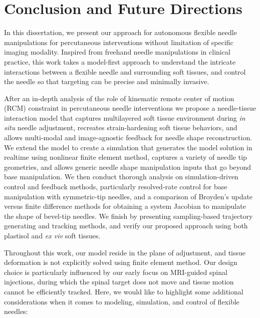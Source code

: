 \chapter{Conclusion and Future Directions}
\label{chap:chap-6}

In this dissertation, we present our approach for autonomous flexible needle manipulations for percutaneous interventions without limitation of specific imaging modality. Inspired from freehand needle manipulations in clinical practice, this work takes a model-first approach to understand the intricate interactions between a flexible needle and surrounding soft tissues, and control the needle so that targeting can be precise and minimally invasive.

After an in-depth analysis of the role of kinematic remote center of motion (RCM) constraint in percutaneous needle interventions  we propose  a needle-tissue interaction model that captures multilayered soft tissue environment during \textit{in situ} needle adjustment, recreates strain-hardening soft tissue behaviors, and allows multi-modal and image-agnostic feedback for needle shape reconstruction. We extend the model  to create a simulation that generates the model solution in realtime using nonlinear finite element method, captures a variety of needle tip geometries, and allows generic needle shape manipulation inputs that go beyond base manipulation. We then conduct thorough analysis on simulation-driven control and feedback methods, particularly resolved-rate control for base manipulation with symmetric-tip needles, and a comparison of Broyden's update versus finite difference methods for obtaining a system Jacobian to manipulate the shape of bevel-tip needles. We finish  by presenting sampling-based trajectory generating and tracking methods, and verify our proposed approach using both plastisol and \textit{ex viv} soft tissues.

Throughout this work, our model reside in the plane of adjustment, and tissue deformation is not explicitly solved using finite element method. Our design choice is particularly influenced by our early focus on MRI-guided spinal injections, during which the spinal target does not move and tissue motion cannot be efficiently tracked. Here, we would like to highlight some additional considerations when it comes to modeling, simulation, and control of flexible needles:

